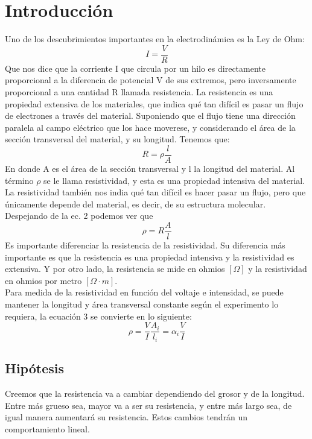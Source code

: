 \documentclass[article,12pt]{elsarticle}
\begin{document}
\section{Introducción}
    Uno de los descubrimientos importantes en la electrodinámica es la Ley de Ohm:
     \begin{equation}
        I = \frac{V}{R}
    \end{equation}
    Que nos dice que la corriente I que circula por un hilo es directamente proporcional a la diferencia de potencial V de sus extremos, pero inversamente proporcional a una cantidad R llamada resistencia. 
    La resistencia es una propiedad extensiva de los materiales, que indica qué tan difícil es pasar un flujo de electrones a través del material. Suponiendo que el flujo tiene una dirección paralela al campo eléctrico que los hace moverese, y considerando el área de la sección transversal del material, y su longitud. Tenemos que:
    \begin{equation}
        R = \rho  \frac{l}{A}
    \end{equation}
    En donde A es el área de la sección transversal y l la longitud del material.
    Al término $\rho$ se le llama resistividad, y esta es una propiedad intensiva del material. La resistividad también nos india qué tan difícil es hacer pasar un flujo, pero que únicamente depende del material, es decir, de su estructura molecular.
    Despejando de la ec. 2 podemos ver que
    \begin{equation}
        \rho = R  \frac{A}{l}
    \end{equation} 
    Es importante diferenciar la resistencia de la resistividad. Su diferencia más importante es que la resistencia es una propiedad intensiva y la resistividad es extensiva. Y por otro lado, la resistencia se mide en ohmios $[\Omega]$ y la resistividad en ohmios por metro $[\Omega \cdot m]$. \\

    Para medida de la resistividad en función del voltaje e intensidad, se puede mantener la longitud y área transversal constante según el experimento lo requiera, la ecuación 3 se convierte en lo siguiente:
    \begin{equation}
        \rho = \frac{V}{I}  \frac{A_i}{l_i} = \alpha_i \frac{V}{I}
    \end{equation} 
    \subsection{Hipótesis}
    Creemos que la resistencia va a cambiar dependiendo del grosor y de la longitud. Entre más grueso sea, mayor va a ser su resistencia, y entre más largo sea, de igual manera aumentará su resistencia. Estos cambios tendrán un comportamiento lineal.
\end{document}
